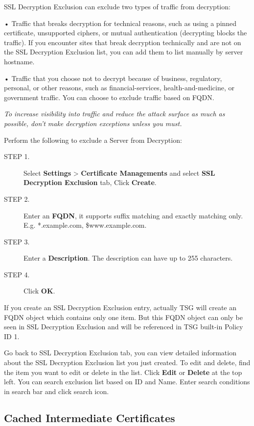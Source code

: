 SSL Decryption Exclusion can exclude two types of traffic from decryption:


• Traffic that breaks decryption for technical reasons, such as using a pinned certificate, unsupported ciphers, or mutual authentication (decrypting blocks the traffic). If you encounter sites that break decryption technically and are not on the SSL Decryption Exclusion list, you can add them to list manually by server hostname.  


• Traffic that you choose not to decrypt because of business, regulatory, personal, or other reasons, such as financial-services, health-and-medicine, or government traffic. You can choose to exclude traffic based on FQDN.


\notemark\textit{To increase visibility into traffic and reduce the attack surface as much as possible, don’t make decryption exceptions unless you must.}


Perform the following to exclude a Server from Decryption:

\begin{description}
    \item[STEP 1.]	Select \textbf{Settings} > \textbf{Certificate Managements} and select \textbf{SSL Decryption Exclusion} tab, Click \textbf{Create}.
    \item[STEP 2.]	Enter an \textbf{FQDN}, it supports suffix matching and exactly matching only. E.g. *.example.com, \$www.example.com. 
    \item[STEP 3.]	Enter a \textbf{Description}. The description can have up to 255 characters.
    \item[STEP 4.]	Click \textbf{OK}.   
\end{description}

If you create an SSL Decryption Exclusion entry, actually TSG will create an FQDN object which contains only one item. But this FQDN object can only be seen in SSL Decryption Exclusion and will be referenced in TSG built-in Policy ID 1. 


Go back to SSL Decryption Exclusion tab, you can view detailed information about the SSL Decryption Exclusion list you just created. 
To edit and delete, find the item you want to edit or delete in the list. Click \textbf{Edit} or \textbf{Delete} at the top left. 
You can search exclusion list based on ID and Name. Enter search conditions in search bar and click search icon.

\subsection*{\hypertarget{link:Cached Intermediate Certificates}{Cached Intermediate Certificates}}
\label{sec:decrypt:certificate:cached}

